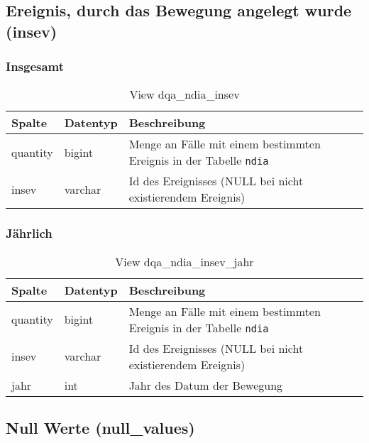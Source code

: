 \newpage

\subsection{Ereignis, durch das Bewegung angelegt wurde (insev)} \label{subsec:bewEreig}

\subsubsection{Insgesamt} \label{subsubsec:bewEreigI}

\begin{table}[ht]
	\centering   
	\caption{View dqa\_ndia\_insev}
	\label{tab:bewEreigI}
	\begin{tabular}{||l|l|p{10cm}||}   		
		\hline
		Spalte & Datentyp & Beschreibung \\ [0.5ex]
		\hline\hline
		quantity & bigint & Menge an Fälle mit einem bestimmten Ereignis in der Tabelle \texttt{ndia} \\
		\hline
		insev & varchar & Id des Ereignisses (NULL bei nicht existierendem Ereignis)\\
		\hline
		
	\end{tabular}
\end{table}

\subsubsection{Jährlich} \label{subsubsec:bewEreigJ}

\begin{table}[ht]
	\centering   
	\caption{View dqa\_ndia\_insev\_jahr}
	\label{tab:bewEreigJ}
	\begin{tabular}{||l|l|p{10cm}||}   		
		\hline
		Spalte & Datentyp & Beschreibung \\ [0.5ex]
		\hline\hline
		quantity & bigint & Menge an Fälle mit einem bestimmten Ereignis in der Tabelle \texttt{ndia}\\
		\hline
		insev & varchar & Id des Ereignisses (NULL bei nicht existierendem Ereignis)\\
		\hline
		jahr & int &  Jahr des Datum der Bewegung \\
		\hline		
	\end{tabular}
\end{table}

\subsection{Null Werte (null\_values)} \label{subsec:bewNull}

